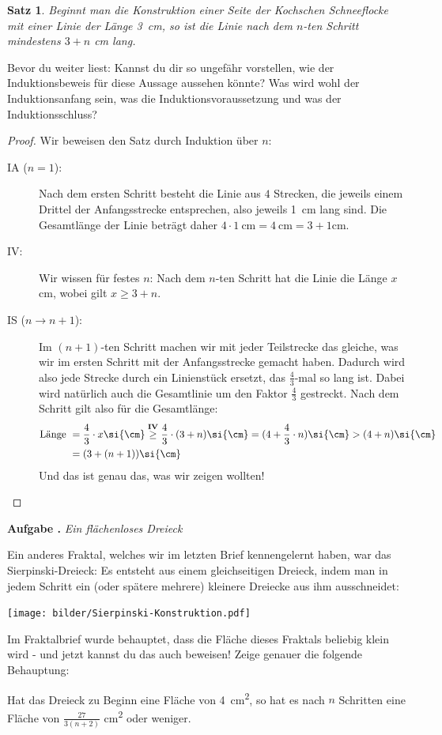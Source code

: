 \documentclass[a4paper,ngerman,12pt]{scrartcl}
\theoremstyle{definition}
\theoremstyle{plain}
\newtheorem{satz}[defn]{Satz}
\theoremstyle{remark}
\newlength{\aufgabenskip}
\newcounter{aufgabennummer}
\newenvironment{aufgabe}[1]{
	\refstepcounter{aufgabennummer}
	\textbf{Aufgabe \theaufgabennummer.} \emph{#1} \par
}{\vspace{\aufgabenskip}}
\begin{document}
\begin{satz}
	Beginnt man die Konstruktion einer Seite der Kochschen Schneeflocke mit einer Linie der Länge \SI{3}{\cm}, so ist die Linie nach dem $n$-ten Schritt mindestens $3+n$ \si{\cm} lang.
\end{satz}

Bevor du weiter liest: Kannst du dir so ungefähr vorstellen, wie der Induktionsbeweis für diese Aussage aussehen könnte? Was wird wohl der Induktionsanfang sein, was die Induktionsvoraussetzung und was der Induktionsschluss?

\begin{proof}
	Wir beweisen den Satz durch Induktion über $n$:
	\begin{description}
		\item[IA ($n=1$):] Nach dem ersten Schritt besteht die Linie aus $4$ Strecken, die jeweils einem Drittel der Anfangsstrecke entsprechen, also jeweils \SI{1}{\cm} lang sind. Die Gesamtlänge der Linie beträgt daher $4 \cdot \SI{1}{\cm} = \SI{4}{\cm} = 3+1\si{\cm}$.
		\item[IV:] Wir wissen für festes $n$: Nach dem $n$-ten Schritt hat die Linie die Länge $x$ \si{\cm}, wobei gilt $x \geq 3+n$.
		\item[IS ($n\to n+1$):] Im $(n+1)$-ten Schritt machen wir mit jeder Teilstrecke das gleiche, was wir im ersten Schritt mit der Anfangsstrecke gemacht haben. Dadurch wird also jede Strecke durch ein Linienstück ersetzt, das $\frac{4}{3}$-mal so lang ist. Dabei wird natürlich auch die Gesamtlinie um den Faktor $\frac{4}{3}$ gestreckt. Nach dem Schritt gilt also für die Gesamtlänge:
			\begin{align*}
			\text{Länge } 	&= \frac{4}{3}\cdot x\si{\cm} \overset{\text{\textbf{IV}}}{\geq} \frac{4}{3}\cdot (3+n)\si{\cm} = (4+\frac{4}{3}\cdot n)\si{\cm} > (4+ n)\si{\cm} \\
							&= (3+ (n+1))\si{\cm}
			\end{align*}
		Und das ist genau das, was wir zeigen wollten!
	\end{description}
\end{proof}

\begin{aufgabe}{Ein flächenloses Dreieck}
	Ein anderes Fraktal, welches wir im letzten Brief kennengelernt haben, war das Sierpinski-Dreieck: Es entsteht aus einem gleichseitigen Dreieck, indem man in jedem Schritt ein (oder spätere mehrere) kleinere Dreiecke aus ihm ausschneidet:
	\begin{center}
		\texttt{[image: bilder/Sierpinski-Konstruktion.pdf]}
	\end{center}
	Im Fraktalbrief wurde behauptet, dass die Fläche dieses Fraktals beliebig klein wird - und jetzt kannst du das auch beweisen! Zeige genauer die folgende Behauptung:
	\begin{center}
		Hat das Dreieck zu Beginn eine Fläche von \SI{4}{\cm\squared}, so hat es nach $n$ Schritten eine Fläche von $\frac{27}{3(n+2)}$ \si{\cm\squared} oder weniger.
	\end{center}
\end{aufgabe}
\end{document}
